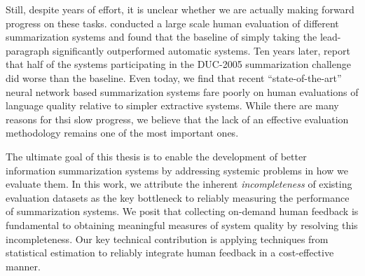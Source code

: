 Still, despite years of effort, it is unclear whether we are actually making forward progress on these tasks.
\citet{brandow1995automatic} conducted a large scale human evaluation of different summarization systems and found that the baseline of simply taking the lead-paragraph significantly outperformed automatic systems. 
Ten years later, \citet{passonneau2005applying} report that half of the systems participating in the DUC-2005 summarization challenge did worse than the baseline.
Even today, we find that recent ``state-of-the-art'' neural network based summarization systems fare poorly on human evaluations of language quality relative to simpler extractive systems.
While there are many reasons for thsi slow progress, we believe that the lack of an effective evaluation methodology remains one of the most important ones.

The ultimate goal of this thesis is to enable the development of better information summarization systems by addressing systemic problems in how we evaluate them.
In this work, we attribute the inherent \textit{incompleteness} of existing evaluation datasets as the key bottleneck to reliably measuring the performance of summarization systems.
We posit that collecting on-demand human feedback is fundamental to obtaining meaningful measures of system quality by resolving this incompleteness.
Our key technical contribution is applying techniques from statistical estimation to reliably integrate human feedback in a cost-effective manner.

